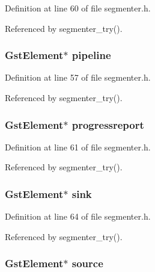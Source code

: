 \-Definition at line 60 of file segmenter.\-h.



\-Referenced by segmenter\-\_\-try().

\hypertarget{struct_transcoder_data_a310ff227733a8a01cb68a9af5e132751}{
\subsubsection[{pipeline}]{\setlength{\rightskip}{0pt plus 5cm}\-Gst\-Element$\ast$ {\bf pipeline}}}\label{struct_transcoder_data_a310ff227733a8a01cb68a9af5e132751}


\-Definition at line 57 of file segmenter.\-h.



\-Referenced by segmenter\-\_\-try().

\hypertarget{struct_transcoder_data_a1c5791a8cd24df307c8937e96e165d60}{
\subsubsection[{progressreport}]{\setlength{\rightskip}{0pt plus 5cm}\-Gst\-Element$\ast$ {\bf progressreport}}}\label{struct_transcoder_data_a1c5791a8cd24df307c8937e96e165d60}


\-Definition at line 61 of file segmenter.\-h.



\-Referenced by segmenter\-\_\-try().

\hypertarget{struct_transcoder_data_a92b8e1a70279c8c57514246bcea2a6c0}{
\subsubsection[{sink}]{\setlength{\rightskip}{0pt plus 5cm}\-Gst\-Element$\ast$ {\bf sink}}}\label{struct_transcoder_data_a92b8e1a70279c8c57514246bcea2a6c0}


\-Definition at line 64 of file segmenter.\-h.



\-Referenced by segmenter\-\_\-try().

\hypertarget{struct_transcoder_data_a258d0be8d8f4992e7579e31c12e06078}{
\subsubsection[{source}]{\setlength{\rightskip}{0pt plus 5cm}\-Gst\-Element$\ast$ {\bf source}}}\label{struct_transcoder_data_a258d0be8d8f4992e7579e31c12e06078}


